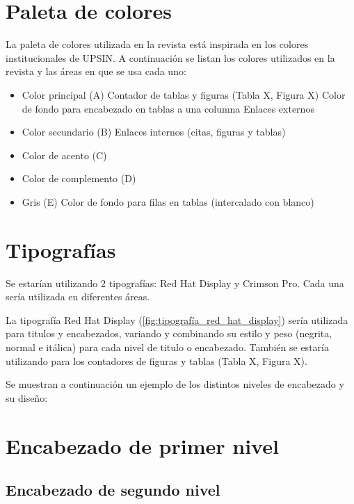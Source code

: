 \documentclass{Manual}
\begin{document}
\section{Paleta de colores}

La paleta de colores utilizada en la revista está inspirada en los colores institucionales de UPSIN. A continuación se listan los colores utilizados en la revista y las áreas en que se usa cada uno:

    

\begin{itemize}
    \item Color principal (A)
        \subitem Contador de tablas y figuras (Tabla X, Figura X)
        \subitem Color de fondo para encabezado en tablas a una columna
        \subitem Enlaces externos
    \item Color secundario (B)
        \subitem Enlaces internos (citas, figuras y tablas)
    \item Color de acento (C)
    \item Color de complemento (D)
    \item Gris (E)
        \subitem Color de fondo para filas en tablas (intercalado con blanco)
\end{itemize}

\section{Tipografías}

Se estarían utilizando 2 tipografías: Red Hat Display y Crimson Pro. Cada una sería utilizada en diferentes  áreas.

La tipografía Red Hat Display (\autoref{fig:tipografía_red_hat_display}) sería utilizada para titulos y encabezados, variando y combinando su estilo y peso (negrita, normal e itálica) para cada nivel de titulo o encabezado. También se estaría utilizando para los contadores de figuras y tablas (Tabla X, Figura X).

    

Se muestran a continuación un ejemplo de los distintos niveles de encabezado y su diseño:
   
\section*{Encabezado de primer nivel}
\subsection*{Encabezado de segundo nivel}
\end{document}
